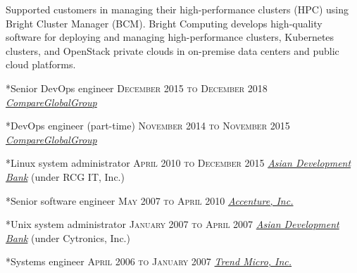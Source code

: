 \documentclass[10pt, a4paper, final]{article}
\begin{document}
\begin{minipage}[t]{0.65\linewidth}
\begin{section}
\begin{subsection}
      Supported customers in managing their high-performance clusters (HPC) using Bright Cluster Manager (BCM). Bright Computing develops high-quality software for deploying and managing high-performance clusters, Kubernetes clusters, and OpenStack private clouds in on-premise data centers and public cloud platforms.
    \end{subsection}
    \vspace{1em}
  
    \begin{subsection}*{Senior DevOps engineer \hfill\textsc{December 2015 to December 2018}}
      \href{http://www.compareglobalgroup.com}{\textit{CompareGlobalGroup}}  
    \end{subsection}
    \vspace{1em}
  
    \begin{subsection}*{DevOps engineer (part-time) \hfill\textsc{November 2014 to November 2015}}
      \href{http://www.compareglobalgroup.com}{\textit{CompareGlobalGroup}}  
    \end{subsection}
    \vspace{1em}
  
    \begin{subsection}*{Linux system administrator \hfill\textsc{April 2010 to December 2015}}
      \href{http://www.adb.org}{\textit{Asian Development Bank}} (under RCG IT, Inc.) 
    \end{subsection}
    \vspace{1em}
  
    \begin{subsection}*{Senior software engineer \hfill\textsc{May 2007 to April 2010}}
      \href{http://www.accenture.com}{\textit{Accenture, Inc.}}  
    \end{subsection}
    \vspace{1em}
  
    \begin{subsection}*{Unix system administrator \hfill\textsc{January 2007 to April 2007}}
      \href{http://www.adb.org}{\textit{Asian Development Bank}} (under Cytronics, Inc.) 
    \end{subsection}
    \vspace{1em}
  
    \begin{subsection}*{Systems engineer \hfill\textsc{April 2006 to January 2007}}
      \href{http://www.trendmicro.com}{\textit{Trend Micro, Inc.}}  
    \end{subsection}
    \vspace{1em}
  

\end{section}
\end{minipage}
\end{document}

